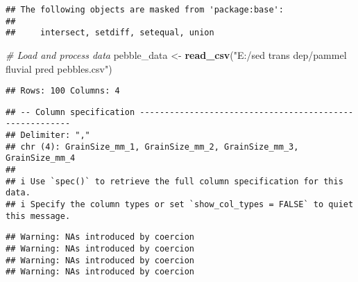\documentclass[
]{article}
\newenvironment{Shaded}{\begin{snugshade}}{\end{snugshade}}
\newcommand{\CommentTok}[1]{\textcolor[rgb]{0.56,0.35,0.01}{\textit{#1}}}
\newcommand{\FunctionTok}[1]{\textcolor[rgb]{0.13,0.29,0.53}{\textbf{#1}}}
\newcommand{\NormalTok}[1]{#1}
\newcommand{\OtherTok}[1]{\textcolor[rgb]{0.56,0.35,0.01}{#1}}
\newcommand{\SpecialCharTok}[1]{\textcolor[rgb]{0.81,0.36,0.00}{\textbf{#1}}}
\newcommand{\StringTok}[1]{\textcolor[rgb]{0.31,0.60,0.02}{#1}}
\begin{document}
\begin{verbatim}
## The following objects are masked from 'package:base':
## 
##     intersect, setdiff, setequal, union
\end{verbatim}

\begin{Shaded}
\begin{Highlighting}[]
\CommentTok{\# Load and process data}
\NormalTok{pebble\_data }\OtherTok{\textless{}{-}} \FunctionTok{read\_csv}\NormalTok{(}\StringTok{"E:/sed trans dep/pammel fluvial pred pebbles.csv"}\NormalTok{)}
\end{Highlighting}
\end{Shaded}

\begin{verbatim}
## Rows: 100 Columns: 4
\end{verbatim}

\begin{verbatim}
## -- Column specification --------------------------------------------------------
## Delimiter: ","
## chr (4): GrainSize_mm_1, GrainSize_mm_2, GrainSize_mm_3, GrainSize_mm_4
## 
## i Use `spec()` to retrieve the full column specification for this data.
## i Specify the column types or set `show_col_types = FALSE` to quiet this message.
\end{verbatim}

\begin{Shaded}
\end{Shaded}

\begin{verbatim}
## Warning: NAs introduced by coercion
## Warning: NAs introduced by coercion
## Warning: NAs introduced by coercion
## Warning: NAs introduced by coercion
\end{verbatim}
\end{document}
